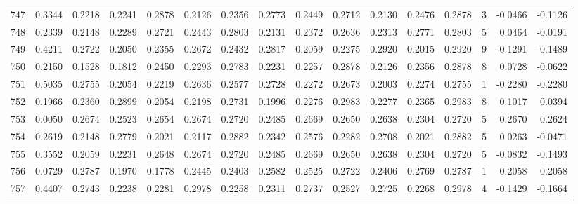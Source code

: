 \begin{tabular}{lrrrrrrrrrrrrrrr}
747 &      0.3344 &  0.2218 &  0.2241 &  0.2878 &  0.2126 &  0.2356 &  0.2773 &  0.2449 &  0.2712 &  0.2130 &   0.2476 &     0.2878 &      3 &                   -0.0466 &                    -0.1126 \\
748 &      0.2339 &  0.2148 &  0.2289 &  0.2721 &  0.2443 &  0.2803 &  0.2131 &  0.2372 &  0.2636 &  0.2313 &   0.2771 &     0.2803 &      5 &                    0.0464 &                    -0.0191 \\
749 &      0.4211 &  0.2722 &  0.2050 &  0.2355 &  0.2672 &  0.2432 &  0.2817 &  0.2059 &  0.2275 &  0.2920 &   0.2015 &     0.2920 &      9 &                   -0.1291 &                    -0.1489 \\
750 &      0.2150 &  0.1528 &  0.1812 &  0.2450 &  0.2293 &  0.2783 &  0.2231 &  0.2257 &  0.2878 &  0.2126 &   0.2356 &     0.2878 &      8 &                    0.0728 &                    -0.0622 \\
751 &      0.5035 &  0.2755 &  0.2054 &  0.2219 &  0.2636 &  0.2577 &  0.2728 &  0.2272 &  0.2673 &  0.2003 &   0.2274 &     0.2755 &      1 &                   -0.2280 &                    -0.2280 \\
752 &      0.1966 &  0.2360 &  0.2899 &  0.2054 &  0.2198 &  0.2731 &  0.1996 &  0.2276 &  0.2983 &  0.2277 &   0.2365 &     0.2983 &      8 &                    0.1017 &                     0.0394 \\
753 &      0.0050 &  0.2674 &  0.2523 &  0.2654 &  0.2674 &  0.2720 &  0.2485 &  0.2669 &  0.2650 &  0.2638 &   0.2304 &     0.2720 &      5 &                    0.2670 &                     0.2624 \\
754 &      0.2619 &  0.2148 &  0.2779 &  0.2021 &  0.2117 &  0.2882 &  0.2342 &  0.2576 &  0.2282 &  0.2708 &   0.2021 &     0.2882 &      5 &                    0.0263 &                    -0.0471 \\
755 &      0.3552 &  0.2059 &  0.2231 &  0.2648 &  0.2674 &  0.2720 &  0.2485 &  0.2669 &  0.2650 &  0.2638 &   0.2304 &     0.2720 &      5 &                   -0.0832 &                    -0.1493 \\
756 &      0.0729 &  0.2787 &  0.1970 &  0.1778 &  0.2445 &  0.2403 &  0.2582 &  0.2525 &  0.2722 &  0.2406 &   0.2769 &     0.2787 &      1 &                    0.2058 &                     0.2058 \\
757 &      0.4407 &  0.2743 &  0.2238 &  0.2281 &  0.2978 &  0.2258 &  0.2311 &  0.2737 &  0.2527 &  0.2725 &   0.2268 &     0.2978 &      4 &                   -0.1429 &                    -0.1664 \\

\end{tabular}
